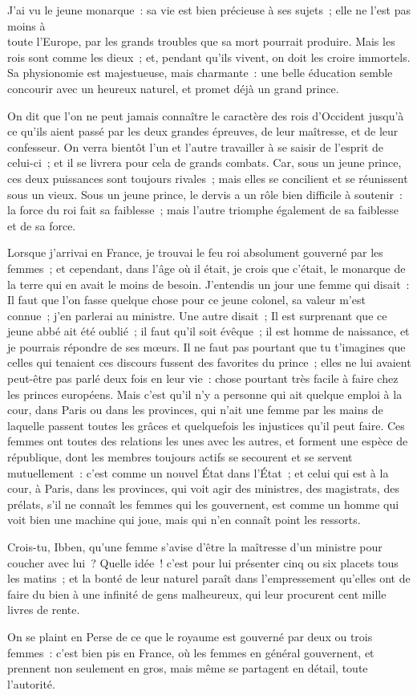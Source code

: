 \documentclass[french,twoside]{book} %
\begin{document}
\noindent J’ai vu le jeune monarque : sa vie est bien précieuse à ses sujets ; elle ne l’est pas moins à \\
toute l’Europe, par les grands troubles que sa mort pourrait produire. Mais les rois sont comme les dieux ; et, pendant qu’ils vivent, on doit les croire immortels. Sa physionomie est majestueuse, mais charmante : une belle éducation semble concourir avec un heureux naturel, et promet déjà un grand prince.\par
On dit que l’on ne peut jamais connaître le caractère des rois d’Occident jusqu’à ce qu’ils aient passé par les deux grandes épreuves, de leur maîtresse, et de leur confesseur. On verra bientôt l’un et l’autre travailler à se saisir de l’esprit de celui-ci ; et il se livrera pour cela de grands combats. Car, sous un jeune prince, ces deux puissances sont toujours rivales ; mais elles se concilient et se réunissent sous un vieux. Sous un jeune prince, le dervis a un rôle bien difficile à soutenir : la force du roi fait sa faiblesse ; mais l’autre triomphe également de sa faiblesse et de sa force.\par
Lorsque j’arrivai en France, je trouvai le feu roi absolument gouverné par les femmes ; et cependant, dans l’âge où il était, je crois que c’était, le monarque de la terre qui en avait le moins de besoin. J’entendis un jour une femme qui disait : Il faut que l’on fasse quelque chose pour ce jeune colonel, sa valeur m’est connue ; j’en parlerai au ministre. Une autre disait ; Il est surprenant que ce jeune abbé ait été oublié ; il faut qu’il soit évêque ; il est homme de naissance, et je pourrais répondre de ses mœurs. Il ne faut pas pourtant que tu t’imagines que celles qui tenaient ces discours fussent des favorites du prince ; elles ne lui avaient peut-être pas parlé deux fois en leur vie : chose pourtant très facile à faire chez les princes européens. Mais c’est qu’il n’y a personne qui ait quelque emploi à la cour, dans Paris ou dans les provinces, qui n’ait une femme par les mains de laquelle passent toutes les grâces et quelquefois les injustices qu’il peut faire. Ces femmes ont toutes des relations les unes avec les autres, et forment une espèce de république, dont les membres toujours actifs se secourent et se servent mutuellement : c’est comme un nouvel État dans l’État ; et celui qui est à la cour, à Paris, dans les provinces, qui voit agir des ministres, des magistrats, des prélats, s’il ne connaît les femmes qui les gouvernent, est comme un homme qui voit bien une machine qui joue, mais qui n’en connaît point les ressorts.\par
Crois-tu, Ibben, qu’une femme s’avise d’être la maîtresse d’un ministre pour coucher avec lui ? Quelle idée ! c’est pour lui présenter cinq ou six placets tous les matins ; et la bonté de leur naturel paraît dans l’empressement qu’elles ont de faire du bien à une infinité de gens malheureux, qui leur procurent cent mille livres de rente.\par
On se plaint en Perse de ce que le royaume est gouverné par deux ou trois femmes : c’est bien pis en France, où les femmes en général gouvernent, et prennent non seulement en gros, mais même se partagent en détail, toute l’autorité.\par
\end{document}
